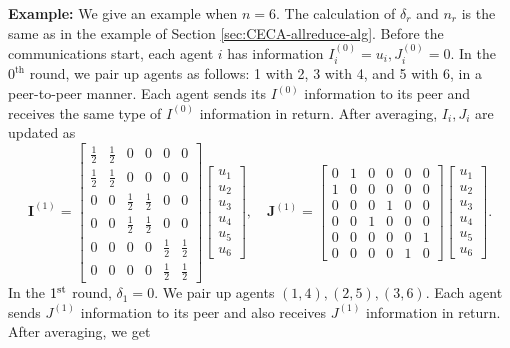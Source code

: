 \documentclass{article}
\newcommand{\vI}{\mathbf{I}}
\newcommand{\vJ}{\mathbf{J}}
\theoremstyle{plain}
\theoremstyle{definition}
\begin{document}
\textbf{Example: }We give an example when $n=6$. The calculation of $\delta_r$ and $n_r$ is the same as in the example of Section \ref{sec:CECA-allreduce-alg}. Before the communications start, each agent $i$ has information $I^{(0)}_i=u_i, J^{(0)}_i=0$. In the $0^{\text{th}}$ round, {we pair up agents as follows: 1 with 2, 3 with 4, and 5 with 6, in a peer-to-peer manner.} Each agent sends its $I^{(0)}$ information to its peer  {and receives the same type of $I^{(0)}$ information in return. After averaging, $I_i,J_i$ are updated as}
\begingroup
\renewcommand{\arraystretch}{1.2} %
$$
\vI^{(1)}
=
\left[
\begin{array}{cccccc}
    \frac{1}{2} & \frac{1}{2} & 0 & 0 & 0 & 0 \\
    \frac{1}{2} & \frac{1}{2} & 0 & 0 & 0 & 0 \\
    0 & 0 & \frac{1}{2} & \frac{1}{2} & 0 & 0 \\
    0 & 0 & \frac{1}{2} & \frac{1}{2} & 0 & 0 \\
    0 & 0 & 0 & 0 & \frac{1}{2} & \frac{1}{2} \\
    0 & 0 & 0 & 0 & \frac{1}{2} & \frac{1}{2}
\end{array}
\right]
\left[
\begin{array}{c}
     u_1  \\
     u_2  \\
     u_3  \\
     u_4  \\
     u_5  \\
     u_6
\end{array}
\right],\quad
\vJ^{(1)}
=
\left[
\begin{array}{cccccc}
    0 & 1 & 0 & 0 & 0 & 0 \\
    1 & 0 & 0 & 0 & 0 & 0 \\
    0 & 0 & 0 & 1 & 0 & 0 \\
    0 & 0 & 1 & 0 & 0 & 0 \\
    0 & 0 & 0 & 0 & 0 & 1 \\
    0 & 0 & 0 & 0 & 1 & 0 
\end{array}
\right]
\left[
\begin{array}{c}
     u_1  \\
     u_2  \\
     u_3  \\
     u_4  \\
     u_5  \\
     u_6
\end{array}
\right].
$$
In the $1^{\textup{st}}$ round, $\delta_1=0$. We pair up agents $(1,4),(2,5),(3,6)$. {Each agent sends $J^{(1)}$ information to its peer and also receives $J^{(1)}$ information in return.} After averaging, we get
\end{document}
